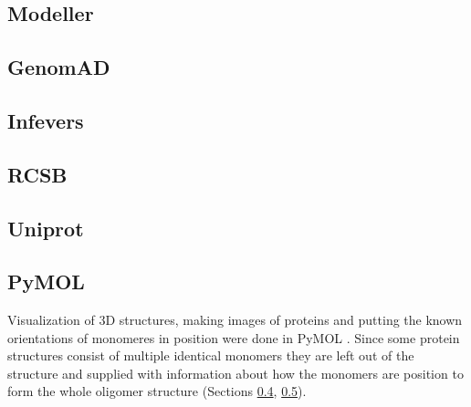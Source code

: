 \subsection{Modeller}
\label{subsec:MM_Modeller}

\subsection{GenomAD}
\label{subsec:MM_GenomAD}

\subsection{Infevers}
\label{subsec:MM_Infevers}

\subsection{RCSB}
\label{subsec:MM_RCSB}

\subsection{Uniprot}
\label{subsec:MM_Uniprot}




\subsection{PyMOL}
Visualization of 3D structures, making images of proteins and putting the known orientations of monomeres in position  were done in PyMOL \cite{}.
Since some protein structures consist of multiple identical monomers they are left out of the structure and supplied with information about how the monomers are position to form the whole oligomer structure (Sections \ref{subsec:MM_RCSB}, \ref{subsec:MM_Uniprot}).
\label{subsec:MM_PyMOL}

